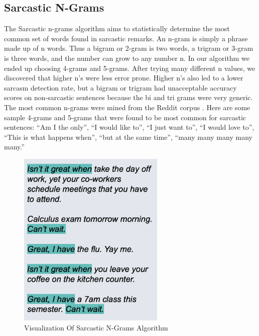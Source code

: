 \documentclass[conference]{IEEEtran}
\begin{document}
\subsection{Sarcastic N-Grams}
The Sarcastic n-grams algorithm aims to statistically determine the most common set of words found in sarcastic remarks. An n-gram is simply a phrase made up of n words. Thus a bigram or 2-gram is two words, a trigram or 3-gram is three words, and the number can grow to any number n. In our algorithm we ended up choosing 4-grams and 5-grams. After trying many different n values, we discovered that higher n’s were less error prone. Higher n’s also led to a lower sarcasm detection rate, but a bigram or trigram had unacceptable accuracy scores on non-sarcastic sentences because the bi and tri grams were very generic. The most common n-grams were mined from the Reddit corpus \cite{b5}. Here are some sample 4-grams and 5-grams that were found to be most common for sarcastic sentences: “Am I the only”, “I would like to”, “I just want to”, “I would love to”, “This is what happens when”, “but at the same time”, “many many many many many.” \\

\begin{figure}[htbp]
\centerline{\includegraphics[width=7cm]{Screen Shot 2020-11-30 at 5.03.05 PM.png}}
\caption{Visualization Of Sarcastic N-Grams Algorithm}
\label{fig7}
\end{figure}
\end{document}
